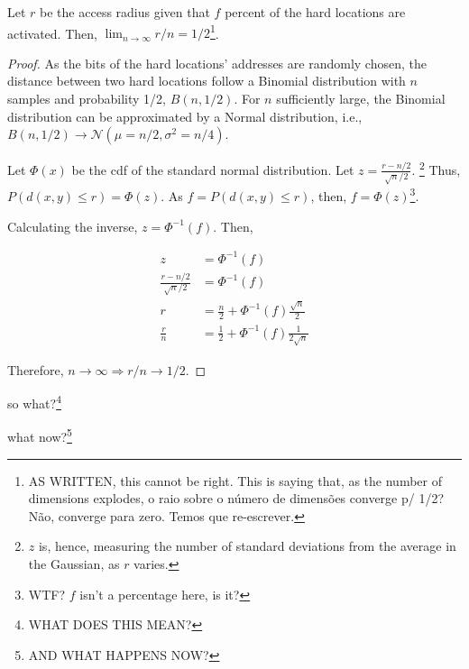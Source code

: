\begin{lemma}
Let $r$ be the access radius given that $f$ percent of the hard locations are activated. Then, $\lim_{n \rightarrow \infty} r/n = 1/2$\footnote{AS WRITTEN, this cannot be right.  This is saying that, as the number of dimensions explodes, o raio sobre o número de dimensões converge p/ 1/2?  Não, converge para zero.  Temos que re-escrever.}.
\label{thm:sdm-access-radius}
\end{lemma}
\begin{proof}

As the bits of the hard locations' addresses are randomly chosen, the distance between two hard locations follow a Binomial distribution with $n$ samples and probability 1/2, $B(n, 1/2)$. For $n$ sufficiently large, the Binomial distribution can be approximated by a Normal distribution, i.e., $B(n, 1/2) \rightarrow \mathcal{N}(\mu = n/2, \sigma^2 = n/4)$.

Let $\Phi(x)$ be the cdf of the standard normal distribution. Let $z = \frac{r - n/2}{\sqrt{n}/2}$. \footnote{$z$ is, hence, measuring the number of standard deviations from the average in the Gaussian, as $r$ varies.}  Thus, $P(d(x, y) \le r) = \Phi(z)$. As $f = P(d(x, y) \le r)$, then, $f = \Phi(z)$\footnote{WTF?  $f$ isn't a percentage here, is it?}.

Calculating the inverse, $z = \Phi^{-1}(f)$. Then,

\begin{align}
z &= \Phi^{-1}(f) \\
\frac{r - n/2}{\sqrt{n}/2} &= \Phi^{-1}(f) \\
r &= \frac{n}{2} + \Phi^{-1}(f) \frac{\sqrt{n}}{2} \\
\frac{r}{n} &= \frac{1}{2} + \Phi^{-1}(f) \frac{1}{2 \sqrt{n}}
\end{align}

Therefore, $n \rightarrow \infty \Rightarrow r/n \rightarrow 1/2$.
\end{proof}

so what?\footnote{WHAT DOES THIS MEAN?}

what now?\footnote{AND WHAT HAPPENS NOW?}

